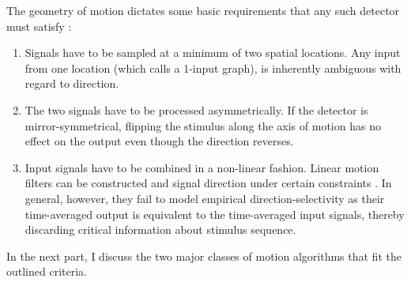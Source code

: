 
The geometry of motion dictates some basic requirements that any such detector must satisfy \citep{Borst:1989vp}:

\begin{enumerate}
    \item Signals have to be sampled at a minimum of two spatial locations. Any input from one location (which \citet{Reichardt:1987uo} calls a 1-input graph), is inherently ambiguous with regard to direction.
    \item The two signals have to be processed asymmetrically. If the detector is mirror-symmetrical, flipping the stimulus along the axis of motion has no effect on the output even though the direction reverses.
    \item Input signals have to be combined in a non-linear fashion. Linear motion filters can be constructed and signal direction under certain constraints \citep[see for instance][]{Watson:1985tl}. In general, however, they fail to model empirical direction-selectivity as their time-averaged output is equivalent to the time-averaged input signals, thereby discarding critical information about stimulus sequence.
\end{enumerate}

In the next part, I discuss the two major classes of motion algorithms that fit the outlined criteria.

